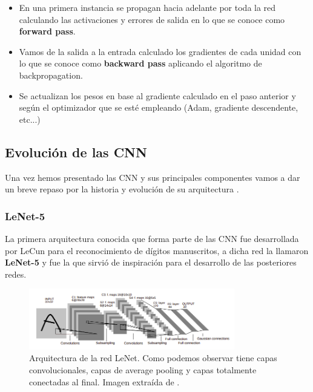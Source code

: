            \begin{itemize}
                \item En una primera instancia se propagan hacia adelante por toda la red calculando las activaciones y errores de salida en lo que se conoce como \textbf{forward pass}.
                \item Vamos de la salida a la entrada calculado los gradientes de cada unidad con lo que se conoce como \textbf{backward pass} aplicando el algoritmo de backpropagation.
                \item Se actualizan los pesos en base al gradiente calculado en el paso anterior y según el optimizador que se esté empleando (Adam, gradiente descendente, etc...)
            \end{itemize}

        \subsection{Evolución de las CNN}
        Una vez hemos presentado las CNN y sus principales componentes vamos a dar un breve repaso por la historia y evolución de su arquitectura \cite{EvolutionCNN}.

        \subsubsection{LeNet-5}
            \noindent La primera arquitectura conocida que forma parte de las CNN fue desarrollada por LeCun \cite{lecun1998gradient} para el reconocimiento de dígitos manuscritos, a dicha red la llamaron \textbf{LeNet-5} y fue la que sirvió de inspiración para el desarrollo de las posteriores redes.

            \begin{figure}[!h]
                \centering
                \includegraphics[width=0.8\textwidth]{img/LeNet.png}
                \caption{Arquitectura de la red LeNet. Como podemos observar tiene capas convolucionales, capas de average pooling y capas totalmente conectadas al final. Imagen extraída de \cite{lecun1998gradient}.}
                \label{fig:LeNet}
            \end{figure}

